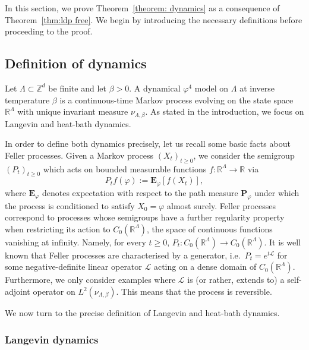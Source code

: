 \documentclass[11pt,a4paper]{article}
\theoremstyle{definition}
\numberwithin{equation}{section}
\begin{document}
In this section, we prove Theorem~\ref{theorem: dynamics} as a consequence of Theorem~\ref{thm:ldp free}. We begin by introducing the necessary definitions before proceeding to the proof.

\subsection{Definition of dynamics}
Let $\Lambda \subset \mathbb Z^d$ be finite and let $\beta > 0$. A dynamical $\varphi^4$ model on $\Lambda$ at inverse temperature $\beta$ is a continuous-time Markov process evolving on the state space $\mathbb R^\Lambda$ with unique invariant measure $\nu_{\Lambda,\beta}$. As stated in the introduction, we focus on Langevin and heat-bath dynamics.

In order to define both dynamics precisely, let us recall some basic facts about Feller processes. Given a Markov process $(X_t)_{t \geq 0}$, we consider the semigroup $(P_t)_{t \geq 0}$ which acts on bounded measurable functions $f:\mathbb R^\Lambda \rightarrow \mathbb R$ via
\begin{equation}
P_t f (\varphi) := \mathbf E_\varphi[ f(X_t)],
\end{equation}
where $\mathbf E_\varphi$ denotes expectation with respect to the path measure $\mathbf P_\varphi$ under which the process is conditioned to satisfy $X_0=\varphi$ almost surely. Feller processes correspond to processes whose semigroups have a further regularity property when restricting its action to $C_0(\mathbb R^\Lambda)$, the space of continuous functions vanishing at infinity. Namely, for every $t \geq 0$, $P_t:C_0(\mathbb R^\Lambda) \rightarrow C_0(\mathbb R^\Lambda)$. It is well known that Feller processes are characterised by a generator, i.e.\ $P_t = e^{t\mathcal L}$ for some negative-definite linear operator $\mathcal L$ acting on a dense domain of $C_0(\mathbb R^\Lambda)$. Furthermore, we only consider examples where $\mathcal L$ is (or rather, extends to) a self-adjoint operator on $L^2(\nu_{\Lambda,\beta})$. This means that the process is reversible.


We now turn to the precise definition of Langevin and heat-bath dynamics.

\subsubsection{Langevin dynamics}
\end{document}
